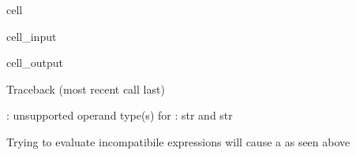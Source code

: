 \documentclass[letterpaper,10pt,english]{jupyterBook}
\begin{document}
\begin{sphinxuseclass}{cell}\begin{sphinxVerbatimInput}

\begin{sphinxuseclass}{cell_input}
\begin{sphinxVerbatim}[commandchars=\\\{\}]
  
\end{sphinxVerbatim}

\end{sphinxuseclass}\end{sphinxVerbatimInput}
\begin{sphinxVerbatimOutput}

\begin{sphinxuseclass}{cell_output}
\begin{sphinxVerbatim}[commandchars=\\\{\}]
Traceback (most recent call last)
 \PYG{p}{[}\PYG{p}{]}  
   

: unsupported operand type(s) for \PYGZhy{}: \PYGZsq{}str\PYGZsq{} and \PYGZsq{}str\PYGZsq{}
\end{sphinxVerbatim}

\end{sphinxuseclass}\end{sphinxVerbatimOutput}

\end{sphinxuseclass}
\sphinxAtStartPar
Trying to evaluate incompatibile expressions will cause a  as seen above
\end{document}
